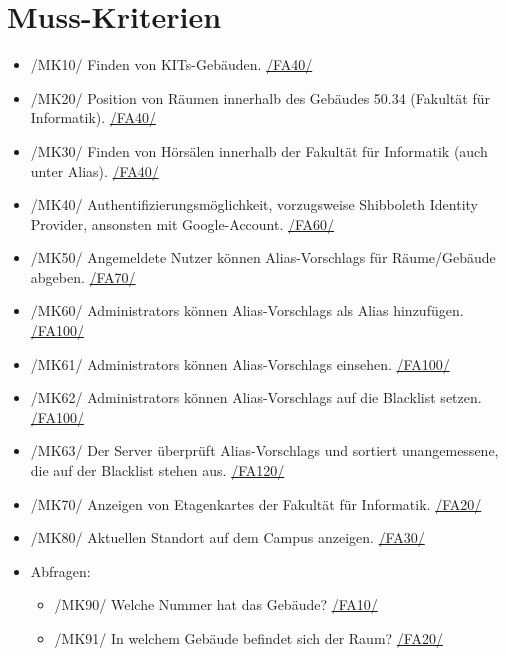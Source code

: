 \section{Muss-Kriterien}

\begin{itemize}

    \item{/MK10/} \label{/MK10/}Finden von \Glspl{KIT}-Gebäuden. \hyperref[/FA40/]{/FA40/}
    \item{/MK20/} \label{/MK20/}Position von Räumen innerhalb des Gebäudes 50.34 (Fakultät für Informatik). \hyperref[/FA40/]{/FA40/}
    \item{/MK30/} \label{/MK30/}Finden von Hörsälen innerhalb der Fakultät für Informatik (auch unter Alias). \hyperref[/FA40/]{/FA40/}
    \item{/MK40/} \label{/MK40/}Authentifizierungsmöglichkeit, vorzugsweise Shibboleth Identity Provider, ansonsten mit Google-Account. \hyperref[/FA60/]{/FA60/}
    \item{/MK50/} \label{/MK50/}Angemeldete Nutzer können \Glspl{Alias-Vorschlag} für Räume/Gebäude abgeben. \hyperref[/FA70/]{/FA70/}
    \item{/MK60/} \label{/MK60/}\Glspl{Administrator} können \Glspl{Alias-Vorschlag} als \Gls{Alias} hinzufügen. \hyperref[/FA100/]{/FA100/}
    \item{/MK61/} \label{/MK61/}\Glspl{Administrator} können \Glspl{Alias-Vorschlag} einsehen. \hyperref[/FA100/]{/FA100/}
    \item{/MK62/} \label{/MK62/}\Glspl{Administrator} können \Glspl{Alias-Vorschlag} auf die \Gls{Blacklist} setzen. \hyperref[/FA100/]{/FA100/}
    \item{/MK63/} \label{/MK63/}Der \Gls{Server} überprüft \Glspl{Alias-Vorschlag} und sortiert unangemessene, die auf der \Gls{Blacklist} stehen aus. \hyperref[/FA120/]{/FA120/} 
    \item{/MK70/} \label{/MK70/}Anzeigen von \Glspl{Etagenkarte} der Fakultät für Informatik. \hyperref[/FA20/]{/FA20/}
    \item{/MK80/} \label{/MK80/}Aktuellen Standort auf dem \Gls{Campus} anzeigen. \hyperref[/FA30/]{/FA30/}
    \item Abfragen:
        \begin{itemize}
            \item{/MK90/} \label{/MK90/}Welche Nummer hat das Gebäude? \hyperref[/FA10/]{/FA10/}
            \item{/MK91/} \label{/MK91/}In welchem Gebäude befindet sich der Raum? \hyperref[/FA20/]{/FA20/}

\end{itemize}
\end{itemize}
